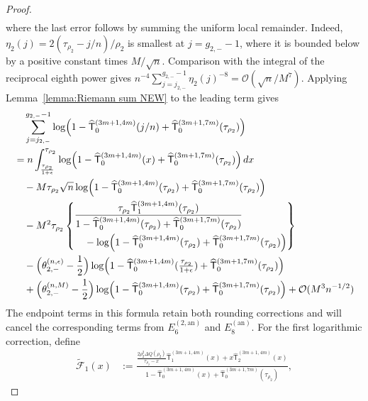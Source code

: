 \documentclass[a4paper]{article}
\numberwithin{equation}{section}
\begin{document}
\begin{proof}
\begin{align*}
\end{align*}
where the last error follows by summing the uniform local remainder.
Indeed, $\eta_2(j)=2(\tau_{\rho_2}-j/n)/\rho_2$ is smallest at
$j=g_{2,-}-1$, where it is bounded below by a positive constant times
$M/\sqrt n$.  Comparison with the integral of the reciprocal eighth
power gives
$n^{-4}\sum_{j=j_{2,-}}^{g_{2,-}-1}\eta_2(j)^{-8}
=\mathcal O(\sqrt n/M^7)$.  Applying
Lemma~\ref{lemma:Riemann sum NEW} to the leading term gives
\begin{align*}
&\quad \sum_{j=j_{2,-}}^{g_{2,-}-1}
\log\Bigl(1-\widehat{\mathsf{T}}_0^{(3m+1,4m)}(j/n)+\widehat{\mathsf{T}}_0^{(3m+1,7m)}(\tau_{\rho_2})\Bigr)
\\
&=
n\int_{\frac{\tau_{\rho_2}}{1+\epsilon}}^{\tau_{\rho_2}}
\log\Bigl(1-\widehat{\mathsf{T}}_0^{(3m+1,4m)}(x)+\widehat{\mathsf{T}}_0^{(3m+1,7m)}(\tau_{\rho_2})\Bigr)\,dx
\\
&\quad 
-M\tau_{\rho_2}\sqrt{n}
\log\Bigl(1-\widehat{\mathsf{T}}_0^{(3m+1,4m)}(\tau_{\rho_2})+\widehat{\mathsf{T}}_0^{(3m+1,7m)}(\tau_{\rho_2})\Bigr)
\\
&\quad 
-M^2\tau_{\rho_2}\left\{\begin{aligned}&
\frac{\tau_{\rho_2}\widehat{\mathsf{T}}_1^{(3m+1,4m)}(\tau_{\rho_2})}{1-\widehat{\mathsf{T}}_0^{(3m+1,4m)}(\tau_{\rho_2})+\widehat{\mathsf{T}}_0^{(3m+1,7m)}(\tau_{\rho_2})}
\\
&\quad-
\log\Bigl(1-\widehat{\mathsf{T}}_0^{(3m+1,4m)}(\tau_{\rho_2})+\widehat{\mathsf{T}}_0^{(3m+1,7m)}(\tau_{\rho_2})\Bigr)
\end{aligned}\right\}
\\
&\quad 
-\Bigl(\theta_{2,-}^{(n,\epsilon)}-\frac{1}{2}\Bigr)\log\Bigl(1-\widehat{\mathsf{T}}_0^{(3m+1,4m)}(\tfrac{\tau_{\rho_2}}{1+\epsilon})+\widehat{\mathsf{T}}_0^{(3m+1,7m)}(\tau_{\rho_2})\Bigr)
\\
&\quad 
+\Bigl(\theta_{2,-}^{(n,M)}-\frac{1}{2}\Bigr)
\log\Bigl(1-\widehat{\mathsf{T}}_0^{(3m+1,4m)}(\tau_{\rho_2})+\widehat{\mathsf{T}}_0^{(3m+1,7m)}(\tau_{\rho_2})\Bigr)
+\mathcal{O}(M^3n^{-1/2})
\end{align*}
The endpoint terms in this formula retain both rounding corrections and will
cancel the corresponding terms from $E_6^{(2,\mathrm{an})}$ and
$E_8^{(\mathrm{an})}$.  For the first logarithmic correction, define
\begin{align*}
\widetilde{\mathscr{F}}_1(x)&:=
\frac{\frac{2\rho_2^2\Delta Q(\rho_2)}{\tau_{\rho_2}-x}
\widehat{\mathsf{T}}_{1}^{(3m+1,4m)}(x)
+x\widehat{\mathsf{T}}_{2}^{(3m+1,4m)}(x)}{1-\widehat{\mathsf{T}}_0^{(3m+1,4m)}(x)+\widehat{\mathsf{T}}_0^{(3m+1,7m)}(\tau_{\rho_2})}, 

\end{align*}
\end{proof}
\end{document}
